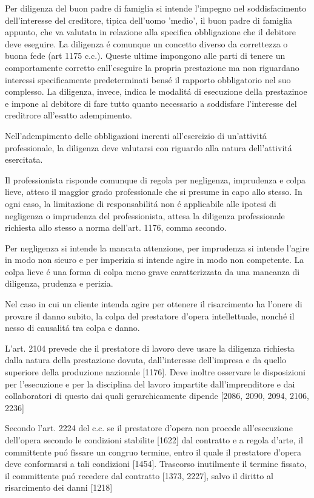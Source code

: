 \documentclass{article}
\begin{document}
Per diligenza del buon padre di famiglia si intende l'impegno nel soddisfacimento dell'interesse del creditore, tipica dell'uomo 'medio', il buon padre di famiglia appunto, che va valutata in relazione alla specifica obbligazione che il debitore deve eseguire. La diligenza \'e comunque un concetto diverso da correttezza o buona fede (art 1175 c.c.). Queste ultime impongono alle parti di tenere un comportamente corretto enll'eseguire la propria prestazione ma non riguardano interessi specificamente predeterminati bens\'e il rapporto obbligatorio nel suo complesso. La diligenza, invece, indica le modalit\'a di esecuzione della prestazinoe e impone al debitore di fare tutto quanto necessario a soddisfare l'interesse del creditrore all'esatto adempimento. 

Nell'adempimento delle obbligazioni inerenti all'esercizio di un'attivit\'a professionale, la diligenza deve valutarsi con riguardo alla natura dell'attivit\'a esercitata. 

Il professionista risponde comunque di regola per negligenza, imprudenza e colpa lieve, atteso il maggior grado professionale che si presume in capo allo stesso. In ogni caso, la limitazione di responsabilit\'a non \'e applicabile alle ipotesi di negligenza o imprudenza del professionista, attesa la diligenza professionale richiesta allo stesso a norma dell'art. 1176, comma secondo. 

Per negligenza si intende la mancata attenzione, per imprudenza si intende l'agire in modo non sicuro e per imperizia si intende agire in modo non competente. La colpa lieve \'e una forma di colpa meno grave caratterizzata da una mancanza di diligenza, prudenza e perizia.

Nel caso in cui un cliente intenda agire per ottenere il risarcimento ha l'onere di provare il danno subito, la colpa del prestatore d'opera intellettuale, nonch\'e il nesso di causalit\'a tra colpa e danno. 

L'art. 2104 prevede che il prestatore di lavoro deve usare la diligenza richiesta dalla natura della prestazione dovuta, dall'interesse dell'impresa e da quello superiore della produzione nazionale [1176]. Deve inoltre osservare le disposizioni per l'esecuzione e per la disciplina del lavoro impartite dall'imprenditore e dai collaboratori di questo dai quali gerarchicamente dipende [2086, 2090, 2094, 2106, 2236]

Secondo l'art. 2224 del c.c. se il prestatore d'opera non procede all'esecuzione dell'opera secondo le condizioni stabilite [1622] dal contratto e a regola d'arte, il committente pu\'o fissare un congruo termine, entro il quale il prestatore d'opera deve conformarsi a tali condizioni [1454]. Trascorso inutilmente il termine fissato, il committente pu\'o recedere dal contratto [1373, 2227], salvo il diritto al risarcimento dei danni [1218]
\end{document}
